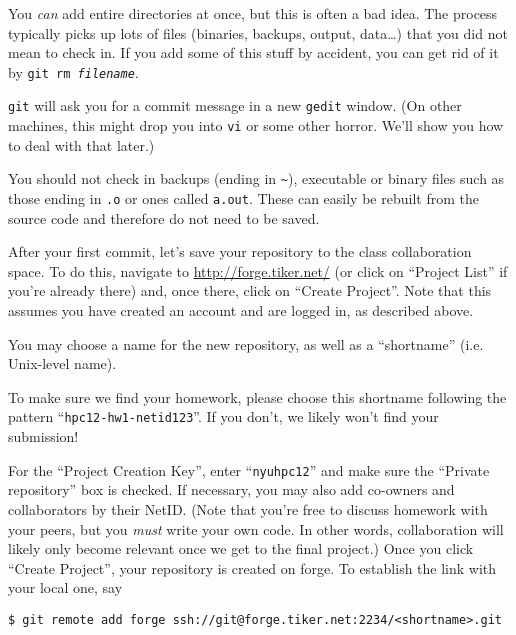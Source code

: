 \documentclass[11pt]{article}
\begin{document}
\begin{note}
You \emph{can} add entire directories at once, but this is often a bad
idea. The process typically picks up lots of files (binaries, backups,
output, data\dots) that you did not mean to check in. If you add some
of this stuff by accident, you can get rid of it by \texttt{git rm
\emph{filename}}.
\end{note}

\texttt{git} will ask you for a commit message in a new \texttt{gedit}
window. (On other machines, this might drop you into \texttt{vi} or
some other horror. We'll show you how to deal with that later.)

\begin{note}
You should not check in backups (ending in \texttt{\~}), executable or
binary files such as those ending in \texttt{.o} or ones called
\texttt{a.out}. These can easily be rebuilt from the source code and
therefore do not need to be saved.
\end{note}

After your first commit, let's save your repository to the class
collaboration space. To do this, navigate to
\url{http://forge.tiker.net/} (or click on ``Project List'' if you're
already there) and, once there, click on ``Create Project''. Note that
this assumes you have created an account and are logged in, as
described above.

You may choose a name for the new repository, as well as a
``shortname'' (i.e.  Unix-level name).

\begin{note}
To make sure we find your homework, please choose
this shortname following the pattern ``\texttt{hpc12-hw1-netid123}''.
If you don't, we likely won't find your submission!
\end{note}

For the ``Project Creation Key'', enter ``\texttt{nyuhpc12}'' and make
sure the ``Private repository'' box is checked. If necessary, you may
also add co-owners and collaborators by their NetID. (Note that you're
free to discuss homework with your peers, but you \emph{must} write
your own code. In other words, collaboration will likely only become
relevant once we get to the final project.)
Once you click ``Create Project'', your repository is created on
forge.  To establish the link with your local one, say
\begin{lstlisting}
$ git remote add forge ssh://git@forge.tiker.net:2234/<shortname>.git
\end{lstlisting}
\end{document}
